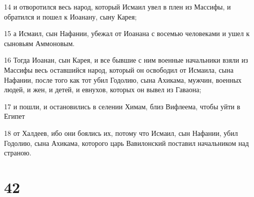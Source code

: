 \par 14 и отворотился весь народ, который Исмаил увел в плен из Массифы, и обратился и пошел к Иоанану, сыну Карея;
\par 15 а Исмаил, сын Нафании, убежал от Иоанана с восемью человеками и ушел к сыновьям Аммоновым.
\par 16 Тогда Иоанан, сын Карея, и все бывшие с ним военные начальники взяли из Массифы весь оставшийся народ, который он освободил от Исмаила, сына Нафании, после того как тот убил Годолию, сына Ахикама, мужчин, военных людей, и жен, и детей, и евнухов, которых он вывел из Гаваона;
\par 17 и пошли, и остановились в селении Химам, близ Вифлеема, чтобы уйти в Египет
\par 18 от Халдеев, ибо они боялись их, потому что Исмаил, сын Нафании, убил Годолию, сына Ахикама, которого царь Вавилонский поставил начальником над страною.

\chapter{42}

